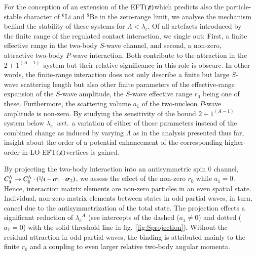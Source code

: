 \documentclass[preprint,12pt]{elsarticle}
\newcommand{\lc}{\ensuremath{\lambda_c}}
\newcommand{\abb}{\ensuremath{2\!+\!1^{(A-1)}}}
\newcommand{\wrt}{\textit{wrt.}~}
\newcommand{\eftnopi}{\mbox{EFT$(\not \! \pi)$}}
\newcommand{\ve}[1]{\ensuremath{\boldsymbol{#1}}}
\newcommand{\figref}[1]{fig.~\ref{#1}}
\begin{document}
For the conception of an extension of the \eftnopi which predicts also the particle-stable character of
$^6$Li and $^8$Be in the zero-range limit, we analyse the mechanism behind the stability of these
systems for $\Lambda<\lc$. Of all artefacts introduced by the finite range of the regulated contact interaction,
we single out: First, a finite effective range in the two-body $S$-wave channel, and second, a non-zero, attractive
two-body $P$-wave interaction. Both contribute to the attraction in the \abb~system but their relative
significance in this role is obscure.
In other words, the finite-range interaction does not only describe a finite but large $S$-wave scattering length
but also other finite parameters of the effective-range expansion of the $S$-wave amplitude, the $S$-wave
effective range $r_0$ being one of these. Furthermore, the scattering volume $a_1$ of the two-nucleon $P$-wave amplitude is
non-zero.
By studying the sensitivity of the bound \abb system below \lc~\wrt a variation of either of those
parameters instead of the combined change as induced by varying $\Lambda$ as in the analysis presented thus far,
insight about the order of a potential enhancement of the corresponding higher-order-in-LO-\eftnopi vertices 
is gained.

By projecting the two-body interaction into an antisymmetric spin 0 channel, 
\mbox{$C_0^\Lambda\to C_0^\Lambda\cdot(\nicefrac{1}{4}-\ve{\sigma}_1\cdot\ve{\sigma}_2)$}, we assess the
effect of the non-zero $r_0$ while $a_1=0$. Hence, interaction matrix elements are non-zero
particles in an even spatial state.
Individual, non-zero matrix elements between states in odd partial waves, in turn, cancel due to the antisymmetrization of
the total state.
The projection effects a significant reduction of $\lc^A$ (see intercepts of the dashed ($a_1\neq0$) and
dotted ($a_1=0$) with the solid threshold line in \figref{fig:Sprojection}). 
Without the residual attraction in odd partial waves, the binding is attributed mainly to the finite $r_0$ and
a coupling to even larger relative two-body angular momenta.
\end{document}

